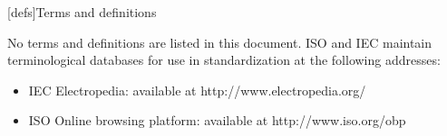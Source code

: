 
[defs]{Terms and definitions}

\pnum
{}%
No terms and definitions are listed in this document. ISO and IEC maintain
terminological databases for use in standardization at the following addresses:

\begin{itemize}
    \item IEC Electropedia: available at http://www.electropedia.org/
    \item ISO Online browsing platform: available at http://www.iso.org/obp
\end{itemize}
